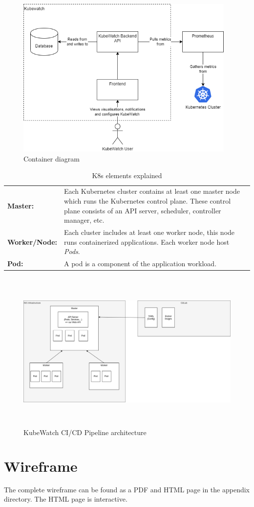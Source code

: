\begin{figure}[h!]
  \centering
  \caption{\label{fig:container-diagram}Container diagram}
  \includegraphics[height=8cm]{resources/Container_diagram.png}
\end{figure}

\begin{table}[h]
  \centering
  \caption{\label{tab:k8s-elements-explained}K8s elements explained}
  \begin{tabular*}{\textwidth}{p{4cm} | p{9cm}}
    \textbf{Master:}
      & Each Kubernetes cluster contains at least one master node which runs the Kubernetes control plane. These control plane consists of an API server, scheduler, controller manager, etc. \\
    \textbf{Worker/Node:}
      & Each cluster includes at least one worker node, this node runs containerized applications. Each worker node host \textit{Pods}. \\
    \textbf{Pod:}
      & A pod is a component of the application workload. \\
  \end{tabular*}
\end{table}

\begin{figure}[h]
  \centering
  \caption{KubeWatch CI/CD Pipeline architecture}
  \label{fig:architecture}
  \includegraphics[height=8cm]{resources/architecture.png}
\end{figure}

\section{Wireframe}
The complete wireframe can be found as a PDF and HTML page in the appendix directory.
The HTML page is interactive.